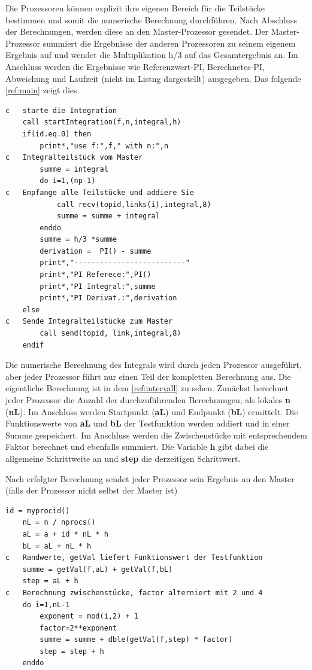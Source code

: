 Die Prozessoren können explizit ihre eigenen Bereich für die Teilstücke bestimmen und somit die numerische Berechnung durchführen.
Nach Abschluss der Berechnungen, werden diese an den Master-Prozessor gesendet.
Der Master-Prozessor summiert die Ergebnisse der anderen Prozessoren zu seinem eigenem Ergebnis auf und wendet die Multiplikation h/3 auf das Gesamtergebnis an.
Im Anschluss werden die Ergebnisse wie Referenzwert-PI, Berechnetes-PI, Abweichung und Laufzeit (nicht im Listng dargestellt) ausgegeben. 
Das folgende \autoref{ref:main} zeigt dies.

\begin{lstlisting}[caption=Empfangen und Auswerten\label{ref:main}]
c	starte die Integration
	call startIntegration(f,n,integral,h)
	if(id.eq.0) then
		print*,"use f:",f," with n:",n
c  	Integralteilstück vom Master
		summe = integral
		do i=1,(np-1)
c 	Empfange alle Teilstücke und addiere Sie
			call recv(topid,links(i),integral,8)
			summe = summe + integral
		enddo
		summe = h/3 *summe
		derivation =  PI() - summe
		print*,"--------------------------"
		print*,"PI Referece:",PI()                   
		print*,"PI Integral:",summe
		print*,"PI Derivat.:",derivation
	else
c	Sende Integralteilstücke zum Master
		call send(topid, link,integral,8)
	endif
\end{lstlisting}

Die numerische Berechnung des Integrals wird durch jeden Prozessor ausgeführt, aber jeder Prozessor führt nur einen Teil der kompletten Berechnung aus.
Die eigentliche Berechnung ist in dem \autoref{ref:intervall} zu sehen.
Zunächst berechnet jeder Prozessor die Anzahl der durchzuführenden Berechnungen, als lokales \textbf{n} (\textbf{nL}).
Im Anschluss werden Startpunkt (\textbf{aL}) und Endpunkt (\textbf{bL}) ermittelt.
Die Funktionswerte von \textbf{aL} und \textbf{bL} der Testfunktion werden addiert und in einer Summe gespeichert.
Im Anschluss werden die Zwischenstücke mit entsprechendem Faktor berechnet und ebenfalls summiert.
Die Variable \textbf{h} gibt dabei die allgemeine Schrittweite an und \textbf{step} die derzeitigen Schrittwert.

Nach erfolgter Berechnung sendet jeder Prozessor sein Ergebnis an den Master (falls der Prozessor nicht selbst der Master ist)

\begin{lstlisting}[caption=Berechnen der relevanten Bereiche für jeden Prozessor\label{ref:intervall}]
	id = myprocid() 
	nL = n / nprocs()
	aL = a + id * nL * h
	bL = aL + nL * h
c	Randwerte, getVal liefert Funktionswert der Testfunktion
	summe = getVal(f,aL) + getVal(f,bL)   
	step = aL + h
c 	Berechnung zwischenstücke, factor alterniert mit 2 und 4
	do i=1,nL-1
		exponent = mod(i,2) + 1
		factor=2**exponent
		summe = summe + dble(getVal(f,step) * factor)
		step = step + h    
	enddo
\end{lstlisting}

